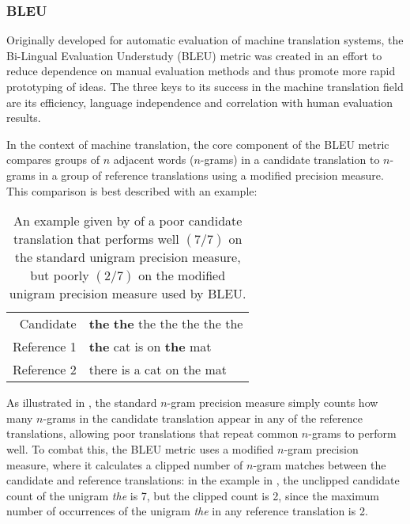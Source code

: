 \subsubsection{BLEU}

Originally developed for automatic evaluation of machine translation systems, the Bi-Lingual Evaluation Understudy (BLEU) metric was created in an effort to reduce dependence on manual evaluation methods and thus promote more rapid prototyping of ideas. The three keys to its success in the machine translation field are its efficiency, language independence and correlation with human evaluation results.

In the context of machine translation, the core component of the BLEU metric compares groups of \(n\) adjacent words (\(n\)-grams) in a candidate translation to \(n\)-grams in a group of reference translations using a modified precision measure. This comparison is best described with an example:

\begin{table}[htbp]
    \centering
    \begin{tabular}{r|l}
        Candidate & \textbf{the} \textbf{the} the the the the the \\
        Reference 1 & \textbf{the} cat is on \textbf{the} mat \\
        Reference 2 & there is a cat on the mat \\
    \end{tabular}
    \caption[An illustration of BLEU's modified \(n\)-gram precision measure \cite{papineni2002bleu}]{An example given by \cite{papineni2002bleu} of a poor candidate translation that performs well \((7/7)\) on the standard unigram precision measure, but poorly \((2/7)\) on the modified unigram precision measure used by BLEU.}
    \label{tab:bleu_ngraph_precision}
\end{table}

As illustrated in \tableautorefname{ \ref{tab:bleu_ngraph_precision}}, the standard \(n\)-gram precision measure simply counts how many \(n\)-grams in the candidate translation appear in any of the reference translations, allowing poor translations that repeat common \(n\)-grams to perform well. To combat this, the BLEU metric uses a modified \(n\)-gram precision measure, where it calculates a clipped number of \(n\)-gram matches between the candidate and reference translations: in the example in \tableautorefname{ \ref{tab:bleu_ngraph_precision}}, the unclipped candidate count of the unigram \textit{the} is 7, but the clipped count is 2, since the maximum number of occurrences of the unigram \textit{the} in any reference translation is 2.

